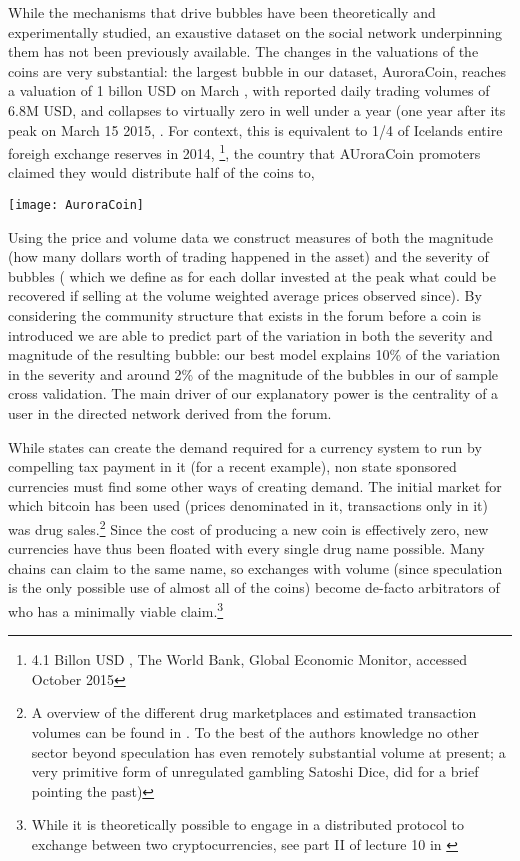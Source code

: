 While the mechanisms that drive bubbles have been theoretically  \cite{abolafia1988enacting, earl2007decision, bakker2010social, harras2011grow} and experimentally \cite{moinas2013bubble} studied, an exaustive dataset on the social network underpinning them has not been previously available.
The changes in the valuations of the coins are very substantial: the largest bubble in our dataset, AuroraCoin, reaches a valuation of 1 billon USD on March , with reported daily trading volumes of 6.8M USD, and collapses to virtually zero in well under a year (one year after its peak on March 15 2015, .
For context, this is equivalent to 1/4 of Icelands entire foreigh exchange reserves in 2014, \footnote{4.1 Billon USD , The World Bank, Global Economic Monitor, accessed October 2015}, the country that AUroraCoin promoters claimed they would distribute half of the coins to, 

\begin{figure*}
\texttt{[image: AuroraCoin]}
\end{figure*}

Using the price and volume data we construct measures of both  the magnitude (how many dollars worth of trading happened in the asset) and the severity of bubbles ( which we define as for each dollar invested at the peak what could be recovered if selling at the volume weighted average prices observed since).
By considering the community structure that exists in the forum before a coin is introduced we are able to predict part of the variation in both the severity and magnitude of the resulting bubble: our best model explains 10\% of the variation in the severity and around 2\% of the magnitude of the bubbles in our of sample cross validation. 
The main driver of our explanatory power is the centrality of a user in the directed network derived from the forum.


While states can create the demand required for a currency system to run by compelling tax payment in it (for a recent example), non state sponsored currencies must find some other ways of creating demand.
The initial market for which bitcoin has been used (prices denominated in it, transactions only in it) was drug sales.\footnote{A overview of the different drug marketplaces and estimated transaction volumes can be found in \cite{soska2015measuring}. To the best of the authors knowledge no other sector beyond speculation has even remotely substantial volume at present; a very primitive form of unregulated gambling Satoshi Dice, did for a brief pointing the past)   }
Since the cost of producing a new coin is effectively zero, new currencies have thus been floated with every single drug name possible. Many chains can claim to the same name, so exchanges with volume (since speculation is the only possible use of almost all of the coins) become de-facto arbitrators of who has a minimally viable claim.\footnote{While it is theoretically possible to engage in a distributed protocol to exchange between two cryptocurrencies, see part II of lecture 10 in \cite{princeton10}}





